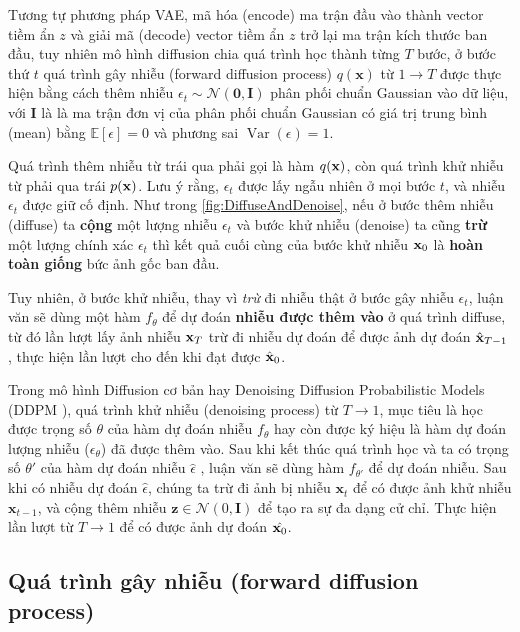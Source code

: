 Tương tự phương pháp VAE, mã hóa (encode) ma trận đầu vào thành vector tiềm ẩn $z$ và giải mã (decode) vector tiềm ẩn $z$ trở lại ma trận kích thước ban đầu, tuy nhiên mô hình diffusion chia quá trình học thành từng $T$ bước, ở bước thứ $t$ quá trình gây nhiễu (forward diffusion process) $q(\mathbf{x})$ từ $1 \to T$ được thực hiện bằng cách thêm nhiễu $\epsilon_{t} \sim \mathcal{N} (\mathbf{0}, \mathbf{I})$ phân phối chuẩn Gaussian vào dữ liệu, với $\mathbf{I}$ là là ma trận đơn vị của phân phối chuẩn Gaussian có giá trị trung bình  (mean) bằng $\mathbb{E}[\epsilon]=0$ và phương sai $\operatorname{Var}(\epsilon)=1$.


Quá trình thêm nhiễu từ trái qua phải gọi là hàm $q(\mathbf{x})$, còn quá trình khử nhiễu từ phải qua trái $p(\mathbf{x})$. Lưu ý rằng, $\epsilon_t$ được lấy ngẫu nhiên ở mọi bước $t$, và nhiễu $\epsilon_t$ được giữ cố định. Như trong \autoref{fig:DiffuseAndDenoise}, nếu ở bước thêm nhiễu (diffuse) ta \textbf{cộng} một lượng nhiễu $\epsilon_t$ và bước khử nhiễu (denoise) ta cũng \textbf{trừ} một lượng chính xác $\epsilon_t$ thì kết quả cuối cùng của bước khử nhiễu $\mathbf{x}_0$ là \textbf{hoàn toàn giống} bức ảnh gốc ban đầu.

Tuy nhiên, ở bước khử nhiễu, thay vì \textit{trừ} đi nhiễu thật ở bước gây nhiễu $\epsilon_t$, luận văn sẽ dùng một hàm $f_{\theta}$ để dự đoán \textbf{nhiễu được thêm vào} ở quá trình diffuse, từ đó lần lượt lấy ảnh nhiễu $\mathbf{x}_T$ trừ đi nhiễu dự đoán để được ảnh dự đoán $\hat{\mathbf{x}}_{T-1}$, thực hiện lần lượt cho đến khi đạt được $\hat{\mathbf{x}}_0$.

Trong mô hình Diffusion cơ bản hay Denoising Diffusion Probabilistic Models (DDPM \cite{ho2020denoising}), quá trình khử nhiễu (denoising process) từ $T \to 1$, mục tiêu là học được trọng số $\theta$ của hàm dự đoán nhiễu $f_{\theta}$ hay còn được ký hiệu là hàm dự đoán lượng nhiễu ($\epsilon_\theta$) đã được thêm vào. Sau khi kết thúc quá trình học và ta có trọng số $\theta'$ của hàm dự đoán nhiễu $\hat{\epsilon}$ , luận văn sẽ dùng hàm $f_{\theta'}$ để dự đoán nhiễu. Sau khi có nhiễu dự đoán $\hat{\epsilon}$, chúng ta trừ đi ảnh bị nhiễu $\mathbf{x}_{t}$ để có được ảnh khử nhiễu $\mathbf{x}_{t-1}$, và cộng thêm nhiễu $ \mathbf{z} \in \mathcal{N}(0, \mathbf{I})$ để tạo ra sự đa dạng cử chỉ. Thực hiện lần lượt từ $T \to 1$ để có được ảnh dự đoán $\hat{\mathbf{x}_0}$.

\subsection{Quá trình gây nhiễu (forward diffusion process)}

